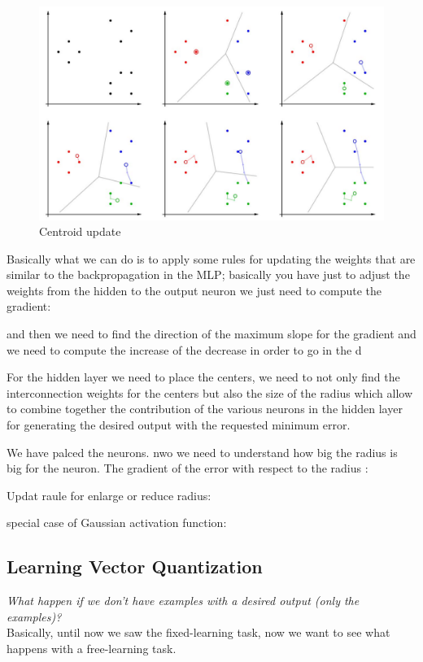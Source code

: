 \documentclass{article}
\begin{document}
\begin{figure}[H]
    \centering
    \includegraphics[scale=0.4]{images/c-means2.png}
    \caption{Centroid update}
\end{figure}

Basically what we can do is to apply some rules for updating the weights that are similar
to the backpropagation in the MLP; basically you have just to adjust the weights from the hidden to the output neuron
we just need to compute the gradient:

and then we need to find the direction of the maximum slope for the gradient and we need to
compute the increase of the decrease in order to go in the d


For the hidden layer we need to place the centers, we need to not only find the interconnection
weights for the centers but also the size of the radius which allow to combine together
the contribution of the various neurons in the hidden layer for generating the desired output
with the requested minimum error.



We have palced the neurons. nwo we need to understand how big the radius is big for the neuron.
The gradient of the error with respect to the radius :

Updat raule for enlarge or reduce radius:

special case of Gaussian activation function:

\subsection{Learning Vector Quantization}
\textit{What happen if we don't have examples with a desired output (only the examples)?}\\Basically,
until now we saw the fixed-learning task, now we want to see what happens with a free-learning task.
\end{document}
